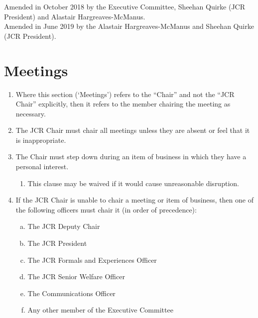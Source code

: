 \documentclass[12pt]{article}  %
\begin{document}
Amended in October 2018 by the Executive Committee, Sheehan Quirke (JCR President) and Alastair Hargreaves-McManus.\\
Amended in June 2019 by the Alastair Hargreaves-McManus and Sheehan Quirke (JCR President).
\newpage
\tableofcontents{}
\newpage


\section{Meetings}
\begin{enumerate}
    \subsection{The Chair}
    \item Where this section (‘Meetings’) refers to the “Chair” and not the “JCR Chair” explicitly, then it refers to the member chairing the meeting as necessary.
    \item The JCR Chair must chair all meetings unless they are absent or feel that it is inappropriate.
    \item The Chair must step down during an item of business in which they have a personal interest.
    \begin{enumerate}
        \item This clause may be waived if it would cause unreasonable disruption.
    \end{enumerate}
    \item If the JCR Chair is unable to chair a meeting or item of business, then one of the following officers must chair it (in order of precedence):
    \begin{enumerate}[(a)]
        \item The JCR Deputy Chair
        \item The JCR President
        \item The JCR Formals and Experiences Officer
        \item The JCR Senior Welfare Officer
        \item The Communications Officer
        \item Any other member of the Executive Committee
    \end{enumerate}

\end{enumerate}
\end{document}
